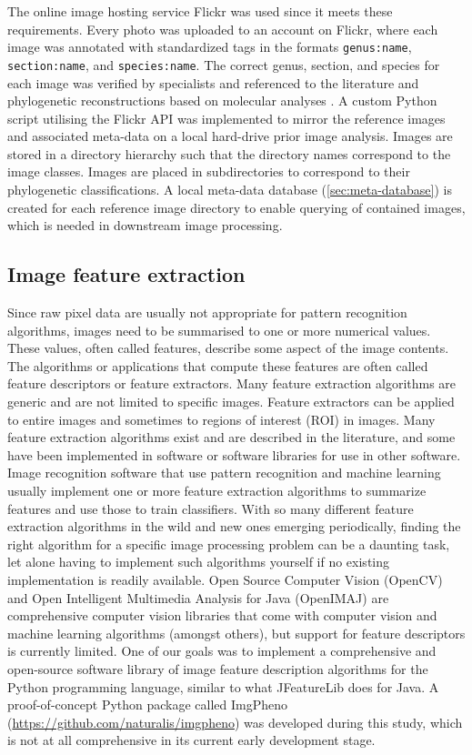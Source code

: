 \documentclass[3p,twocolumn,10pt]{elsarticle}
\begin{document}
The online image hosting service Flickr was used since it meets these requirements. Every photo was uploaded to an account on Flickr, where each image was annotated with standardized tags in the formats \verb/genus:name/, \verb/section:name/, and \verb/species:name/. The correct genus, section, and species for each image was verified by specialists and referenced to the literature \citet{Cribb1998, Pridgeon1999, Frosch2012} and phylogenetic reconstructions based on molecular analyses \citep{Li2011, Chochai2012}. A custom Python script utilising the Flickr API was implemented to mirror the reference images and associated meta-data on a local hard-drive prior image analysis. Images are stored in a directory hierarchy such that the directory names correspond to the image classes. Images are placed in subdirectories to correspond to their phylogenetic classifications. A local meta-data database (\ref{sec:meta-database}) is created for each reference image directory to enable querying of contained images, which is needed in downstream image processing.

\subsection{Image feature extraction}

Since raw pixel data are usually not appropriate for pattern recognition algorithms, images need to be summarised to one or more numerical values. These values, often called features, describe some aspect of the image contents. The algorithms or applications that compute these features are often called feature descriptors or feature extractors. Many feature extraction algorithms are generic and are not limited to specific images. Feature extractors can be applied to entire images and sometimes to regions of interest (ROI) in images. Many feature extraction algorithms exist and are described in the literature, and some have been implemented in software or software libraries for use in other software. Image recognition software that use pattern recognition and machine learning usually implement one or more feature extraction algorithms to summarize features and use those to train classifiers. With so many different feature extraction algorithms in the wild and new ones emerging periodically, finding the right algorithm for a specific image processing problem can be a daunting task, let alone having to implement such algorithms yourself if no existing implementation is readily available. Open Source Computer Vision (OpenCV) and Open Intelligent Multimedia Analysis for Java (OpenIMAJ) are comprehensive computer vision libraries that come with computer vision and machine learning algorithms (amongst others), but support for feature descriptors is currently limited. One of our goals was to implement a comprehensive and open-source software library of image feature description algorithms for the Python programming language, similar to what JFeatureLib does for Java. A proof-of-concept Python package called ImgPheno (\url{https://github.com/naturalis/imgpheno}) was developed during this study, which is not at all comprehensive in its current early development stage.
\end{document}
